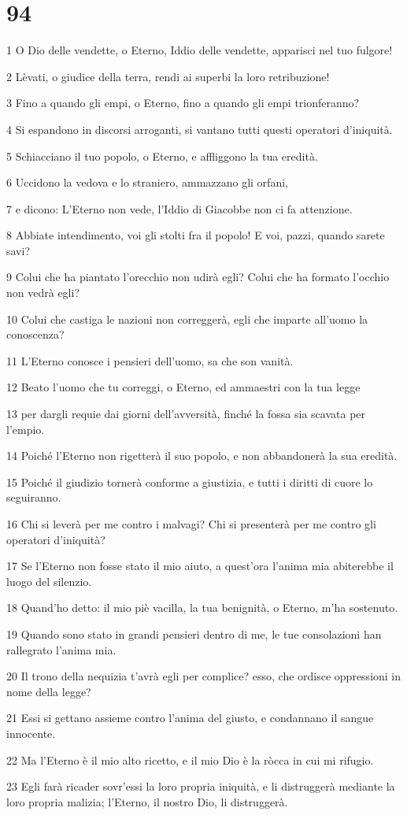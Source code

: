 \chapter{94}

\par 1 O Dio delle vendette, o Eterno, Iddio delle vendette, apparisci nel tuo fulgore!
\par 2 Lèvati, o giudice della terra, rendi ai superbi la loro retribuzione!
\par 3 Fino a quando gli empi, o Eterno, fino a quando gli empi trionferanno?
\par 4 Si espandono in discorsi arroganti, si vantano tutti questi operatori d'iniquità.
\par 5 Schiacciano il tuo popolo, o Eterno, e affliggono la tua eredità.
\par 6 Uccidono la vedova e lo straniero, ammazzano gli orfani,
\par 7 e dicono: L'Eterno non vede, l'Iddio di Giacobbe non ci fa attenzione.
\par 8 Abbiate intendimento, voi gli stolti fra il popolo! E voi, pazzi, quando sarete savi?
\par 9 Colui che ha piantato l'orecchio non udirà egli? Colui che ha formato l'occhio non vedrà egli?
\par 10 Colui che castiga le nazioni non correggerà, egli che imparte all'uomo la conoscenza?
\par 11 L'Eterno conosce i pensieri dell'uomo, sa che son vanità.
\par 12 Beato l'uomo che tu correggi, o Eterno, ed ammaestri con la tua legge
\par 13 per dargli requie dai giorni dell'avversità, finché la fossa sia scavata per l'empio.
\par 14 Poiché l'Eterno non rigetterà il suo popolo, e non abbandonerà la sua eredità.
\par 15 Poiché il giudizio tornerà conforme a giustizia, e tutti i diritti di cuore lo seguiranno.
\par 16 Chi si leverà per me contro i malvagi? Chi si presenterà per me contro gli operatori d'iniquità?
\par 17 Se l'Eterno non fosse stato il mio aiuto, a quest'ora l'anima mia abiterebbe il luogo del silenzio.
\par 18 Quand'ho detto: il mio piè vacilla, la tua benignità, o Eterno, m'ha sostenuto.
\par 19 Quando sono stato in grandi pensieri dentro di me, le tue consolazioni han rallegrato l'anima mia.
\par 20 Il trono della nequizia t'avrà egli per complice? esso, che ordisce oppressioni in nome della legge?
\par 21 Essi si gettano assieme contro l'anima del giusto, e condannano il sangue innocente.
\par 22 Ma l'Eterno è il mio alto ricetto, e il mio Dio è la ròcca in cui mi rifugio.
\par 23 Egli farà ricader sovr'essi la loro propria iniquità, e li distruggerà mediante la loro propria malizia; l'Eterno, il nostro Dio, li distruggerà.

